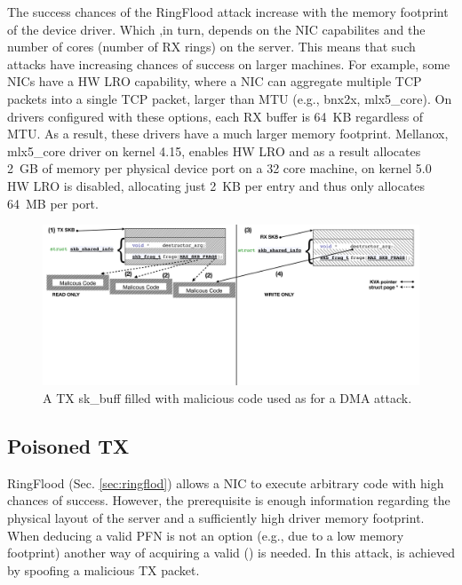 The success chances of the RingFlood attack increase with the memory footprint of the device driver. Which ,in turn, depends on the NIC capabilites and the number of cores (number of RX rings) on the server. This means that such attacks have increasing chances of success on larger machines. 
For example, some NICs have a HW LRO capability\cite{mlx5_lro}, where a NIC can aggregate multiple TCP packets into a single TCP packet, larger than MTU (e.g., bnx2x, mlx5\_core). On drivers configured with these options, each RX buffer is 64~KB regardless of MTU. As a result, these drivers have a much larger memory footprint. Mellanox, mlx5\_core driver on kernel 4.15, enables HW LRO and as a result allocates 2~GB of memory per physical device port on a 32 core machine, on kernel 5.0 HW LRO is disabled, allocating just 2~KB per entry and thus only allocates 64~MB per port.

\begin{figure}[t]
    \centering
    \includegraphics[width=\linewidth]{figs/accomplice.pdf}
    \caption{A TX sk\_buff filled with malicious code used as \means{} for a DMA attack.}
    \label{fig:payload}
\end{figure}
\subsection{Poisoned TX}\label{sec:posion}

RingFlood (Sec. \ref{sec:ringflod}) allows a NIC to execute arbitrary code with high chances of success. However, the prerequisite is enough information regarding the physical layout of the server and a sufficiently high driver memory footprint. When deducing a valid PFN is not an option (e.g., due to a low memory footprint) another way of acquiring a valid \kva{} (\motivation) is needed.
%
In this attack, \motivation is achieved by spoofing a malicious TX packet.

